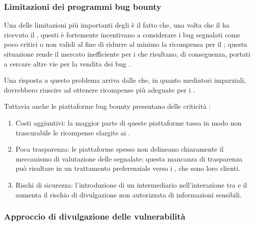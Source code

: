\subsubsection{Limitazioni dei programmi bug bounty}

Una delle limitazioni più importanti degli \internalBBP è il fatto che, una volta che il \BI ha ricevuto il \bugreport, questi è fortemente incentivano a considerare i bug segnalati come poco critici o non validi al fine di ridurre al minimo la ricompensa per il \BH \cite{canidio2021verioss, akgul2023bughunters}; questa situazione rende il mercato inefficiente per i \BH che risultano, di conseguenza, portati a cercare altre vie per la vendita dei bug \cite{canidio2021verioss}.

\medskip

Una risposta a questo problema arriva dalle \bugbountyplatform che, in quanto mediatori imparziali, dovrebbero riuscire ad ottenere ricompense più adeguate per i \BH \cite{canidio2021verioss, akgul2023bughunters}. 

\medskip

Tuttavia anche le piattaforme bug bounty presentano delle criticità \cite{badash2021blockbounty}:
\begin{enumerate}

\item Costi aggiuntivi: la maggior parte di queste piattaforme tassa in modo non trascurabile le ricompense elargite ai \BH.

\item Poca trasparenza: le piattaforme spesso non delineano chiaramente il meccanismo di valutazione delle \vulnerability segnalate; questa mancanza di trasparenza può risultare in un trattamento preferenziale verso i \BI, che sono loro clienti.

\item Rischi di sicurezza: l'introduzione di un intermediario nell'interazione tra \BI e il \BH aumenta il rischio di divulgazione non autorizzata di informazioni sensibili.

\end{enumerate}

\subsubsection{Approccio di divulgazione delle vulnerabilità}

